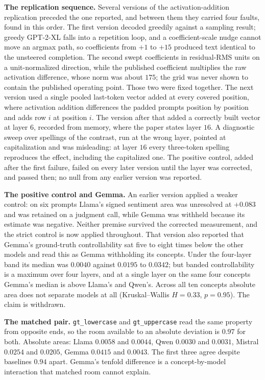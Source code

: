 \documentclass{article}
\begin{document}
\textbf{The replication sequence.} Several versions of the activation-addition
replication preceded the one reported, and between them they carried four
faults, found in this order. The first version decoded greedily against a
sampling result; greedy GPT-2-XL falls into a repetition loop, and a
coefficient-scale nudge cannot move an argmax path, so coefficients from $+1$ to
$+15$ produced text identical to the unsteered completion. The second swept
coefficients in residual-RMS units on a unit-normalized direction, while the
published coefficient multiplies the raw activation difference, whose norm was
about $175$; the grid was never shown to contain the published operating point.
Those two were fixed together. The next version used a single pooled last-token
vector added at every covered position, where activation addition differences
the padded prompts position by position and adds row $i$ at position $i$. The
version after that added a correctly built vector at layer $6$, recorded from
memory, where the paper states layer $16$. A
diagnostic sweep over spellings of the contrast, run at the wrong layer, pointed
at capitalization and was misleading: at layer $16$ every three-token spelling
reproduces the effect, including the capitalized one. The positive control,
added after the first failure, failed on every later version until the layer was
corrected, and passed then; no null from any earlier version was reported.

\textbf{The positive control and Gemma.} An earlier version applied a weaker
control: on six prompts Llama's signed sentiment area was unresolved at $+0.083$
and was retained on a judgment call, while Gemma was withheld because its
estimate was negative. Neither premise survived the corrected measurement, and
the strict control is now applied throughout. That version also reported that
Gemma's ground-truth controllability sat five to eight times below the other
models and read this as Gemma withholding its concepts. Under the four-layer
band its median was $0.0040$ against $0.0195$ to $0.0342$; but banded
controllability is a maximum over four layers, and at a single layer on the same
four concepts Gemma's median is above Llama's and Qwen's. Across all ten concepts
absolute area does not separate models at all (Kruskal--Wallis $H=0.33$,
$p=0.95$). The claim is withdrawn.

\textbf{The matched pair.} \texttt{gt\_lowercase} and \texttt{gt\_uppercase} read
the same property from opposite ends, so the room available to an absolute
deviation is $0.97$ for both. Absolute areas: Llama $0.0058$ and $0.0044$, Qwen
$0.0030$ and $0.0031$, Mistral $0.0254$ and $0.0205$, Gemma $0.0415$ and
$0.0043$. The first three agree despite baselines $0.94$ apart. Gemma's tenfold
difference is a concept-by-model interaction that matched room cannot explain.
\end{document}
